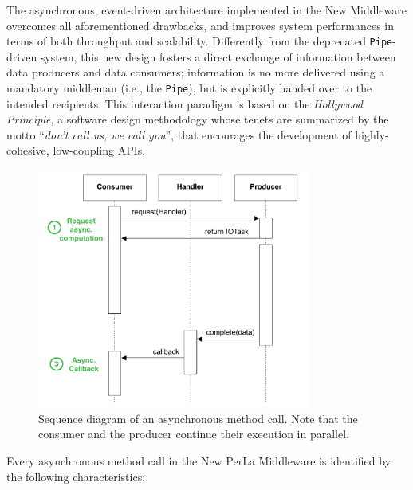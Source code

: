 The asynchronous, event-driven architecture implemented in the New Middleware
overcomes all aforementioned drawbacks, and improves system performances in
terms of both throughput and scalability. Differently from the deprecated
\texttt{Pipe}-driven system, this new design fosters a direct exchange of
information between data producers and data consumers; information is no more
delivered using a mandatory middleman (i.e., the \texttt{Pipe}), but is
explicitly handed over to the intended recipients. This interaction paradigm is
based on the \textit{Hollywood Principle}, a software design methodology whose
tenets are summarized by the motto ``\textit{don't call us, we call you}'',
that encourages the development of highly-cohesive, low-coupling APIs, 

\begin{figure}[h!]
\center
\includegraphics[width=0.8\textwidth]{imgs/async_paradigm.pdf}
\caption{Sequence diagram of an asynchronous method call. Note that the
consumer and the producer continue their execution in parallel.}
\label{fig:async_paradigm}
\end{figure}

Every asynchronous method call in the New PerLa Middleware is identified by the
following characteristics:

